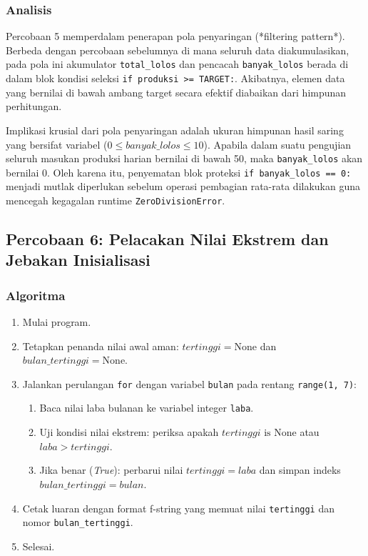 \documentclass[12pt,a4paper]{article}
\begin{document}
\subsubsection{Analisis}
Percobaan 5 memperdalam penerapan pola penyaringan (*filtering pattern*). Berbeda dengan percobaan sebelumnya di mana seluruh data diakumulasikan, pada pola ini akumulator \texttt{total\_lolos} dan pencacah \texttt{banyak\_lolos} berada di dalam blok kondisi seleksi \texttt{if produksi >= TARGET:}. Akibatnya, elemen data yang bernilai di bawah ambang target secara efektif diabaikan dari himpunan perhitungan.

Implikasi krusial dari pola penyaringan adalah ukuran himpunan hasil saring yang bersifat variabel ($0 \le banyak\_lolos \le 10$). Apabila dalam suatu pengujian seluruh masukan produksi harian bernilai di bawah 50, maka \texttt{banyak\_lolos} akan bernilai 0. Oleh karena itu, penyematan blok proteksi \texttt{if banyak\_lolos == 0:} menjadi mutlak diperlukan sebelum operasi pembagian rata-rata dilakukan guna mencegah kegagalan runtime \texttt{ZeroDivisionError}.

\subsection{Percobaan 6: Pelacakan Nilai Ekstrem dan Jebakan Inisialisasi}
\subsubsection{Algoritma}
\begin{enumerate}
    \item Mulai program.
    \item Tetapkan penanda nilai awal aman: $tertinggi = \text{None}$ dan $bulan\_tertinggi = \text{None}$.
    \item Jalankan perulangan \texttt{for} dengan variabel \texttt{bulan} pada rentang \texttt{range(1, 7)}:
    \begin{enumerate}[label=\alph*.]
        \item Baca nilai laba bulanan ke variabel integer \texttt{laba}.
        \item Uji kondisi nilai ekstrem: periksa apakah $tertinggi \text{ is None}$ atau $laba > tertinggi$.
        \item Jika benar (\textit{True}): perbarui nilai $tertinggi = laba$ dan simpan indeks $bulan\_tertinggi = bulan$.
    \end{enumerate}
    \item Cetak luaran dengan format f-string yang memuat nilai \texttt{tertinggi} dan nomor \texttt{bulan\_tertinggi}.
    \item Selesai.
\end{enumerate}
\end{document}
